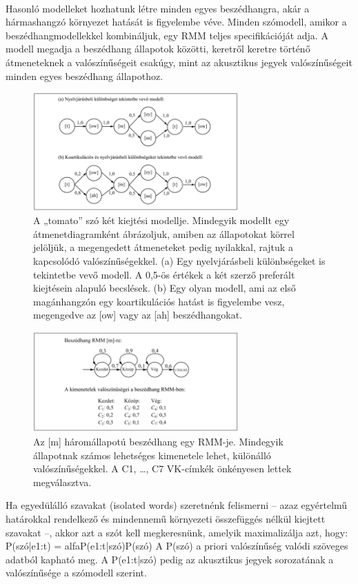 \documentclass[a4paper,12pt]{paper}
\begin{document}
\\Hasonló modelleket hozhatunk létre minden egyes beszédhangra, akár a hármashangzó környezet hatását is figyelembe véve. Minden szómodell, amikor a beszédhangmodellekkel kombináljuk, egy RMM teljes specifikációját adja. A modell megadja a beszédhang állapotok közötti, keretről keretre történő átmeneteknek a valószínűségeit csakúgy, mint az akusztikus jegyek valószínűségeit minden egyes beszédhang állapothoz.
\begin{figure}[h]
	\centering
	\includegraphics[width=0.7\textwidth]{szavak1}
	\caption{A „tomato” szó két kiejtési modellje. Mindegyik modellt egy átmenetdiagramként ábrázoljuk, amiben az állapotokat körrel jelöljük, a megengedett átmeneteket pedig nyilakkal, rajtuk a kapcsolódó valószínűségekkel. (a) Egy nyelvjárásbeli különbségeket is tekintetbe vevő modell. A 0,5-ös értékek a két szerző preferált kiejtésein alapuló becslések. (b) Egy olyan modell, ami az első magánhangzón egy koartikulációs hatást is figyelembe vesz, megengedve az [ow] vagy az [ah] beszédhangokat.
	}
\end{figure}
\newpage
\begin{figure}[h]
	\centering
	\includegraphics[width=0.7\textwidth]{szavak2}
	\caption{Az [m] háromállapotú beszédhang egy RMM-je. Mindegyik állapotnak számos lehetséges kimenetele lehet, különálló valószínűségekkel. A C1, …, C7 VK-címkék önkényesen lettek megválasztva.}
\end{figure}
Ha egyedülálló szavakat (isolated words) szeretnénk felismerni – azaz egyértelmű határokkal rendelkező és mindennemű környezeti összefüggés nélkül kiejtett szavakat –, akkor azt a szót kell megkeresnünk, amelyik maximalizálja azt, hogy:
\\ P(szó|e1:t) = alfaP(e1:t|szó)P(szó) 
A P(szó) a priori valószínűség valódi szöveges adatból kapható meg. A P(e1:t|szó) pedig az akusztikus jegyek sorozatának a valószínűsége a szómodell szerint. 
\end{document}
